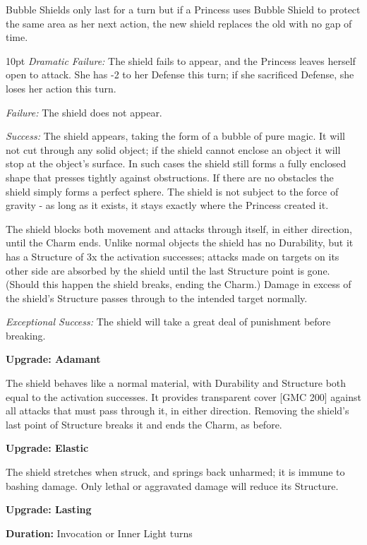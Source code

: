 Bubble Shields only last for a turn but if a Princess uses Bubble Shield to protect the same area as her next action, the new shield replaces the old with no gap of time.

\begin{myindentpar}{10pt}    \emph{Dramatic Failure:} The shield fails to appear, and the Princess leaves herself open to attack. She has -2 to her Defense this turn; if she sacrificed Defense, she loses her action this turn.

\emph{Failure:} The shield does not appear.

\emph{Success:} The shield appears, taking the form of a bubble of pure magic. It will not cut through any solid object; if the shield cannot enclose an object it will stop at the object’s surface. In such cases the shield still forms a fully enclosed shape that presses tightly against obstructions. If there are no obstacles the shield simply forms a perfect sphere. The shield is not subject to the force of gravity - as long as it exists, it stays exactly where the Princess created it.

The shield blocks both movement and attacks through itself, in either direction, until the Charm ends. Unlike normal objects the shield has no Durability, but it has a Structure of 3x the activation successes; attacks made on targets on its other side are absorbed by the shield until the last Structure point is gone. (Should this happen the shield breaks, ending the Charm.) Damage in excess of the shield’s Structure passes through to the intended target normally.

\emph{Exceptional Success:} The shield will take a great deal of punishment before breaking.

\textbf{Upgrade: Adamant}

The shield behaves like a normal material, with Durability and Structure both equal to the activation successes. It provides transparent cover [GMC 200] against all attacks that must pass through it, in either direction. Removing the shield’s last point of Structure breaks it and ends the Charm, as before.

\textbf{Upgrade: Elastic}

The shield stretches when struck, and springs back unharmed; it is immune to bashing damage. Only lethal or aggravated damage will reduce its Structure.

\textbf{Upgrade: Lasting}

\noindent \textbf{Duration:} Invocation or Inner Light turns


\end{myindentpar}
